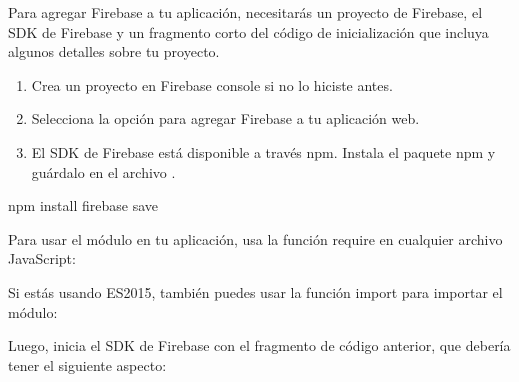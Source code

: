 Para agregar Firebase a tu aplicación, necesitarás un proyecto de Firebase, el SDK de Firebase y un fragmento corto del código de inicialización que incluya algunos detalles sobre tu proyecto.
\begin{enumerate}
\item {} 
Crea un proyecto en Firebase console si no lo hiciste antes.

\item {} 
Selecciona la opción para agregar Firebase a tu aplicación web.

\item {} 
El SDK de Firebase está disponible a través npm. Instala el paquete npm  y guárdalo en el archivo .

\end{enumerate}

%
\begin{sphinxVerbatim}[commandchars=\\\{\}]
npm install firebase \PYGZhy{}\PYGZhy{}save
\end{sphinxVerbatim}

Para usar el módulo en tu aplicación, usa la función require en cualquier archivo JavaScript:

%
\begin{sphinxVerbatim}[commandchars=\\\{\}]
   
\end{sphinxVerbatim}

Si estás usando ES2015, también puedes usar la función import para importar el módulo:

%
\begin{sphinxVerbatim}[commandchars=\\\{\}]
     
\end{sphinxVerbatim}

Luego, inicia el SDK de Firebase con el fragmento de código anterior, que debería tener el siguiente aspecto:

